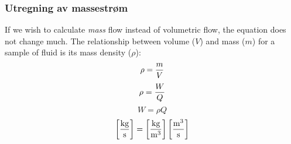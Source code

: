 \documentclass{beamer}
\begin{document}
%
\begin{frame}
	\frametitle{Utregning av massestrøm}

	


%
If we wish to calculate \textit{mass} flow instead of volumetric flow, the equation does not change much.  The relationship between volume ($V$) and mass ($m$) for a sample of fluid is its mass density ($\rho$):
%
$$\rho = {m \over V}$$
%
%
$$\rho = {W \over Q}$$
%
%
$$W = \rho Q$$
%
%
$$\left[\hbox{kg} \over \hbox{s}\right] = \left[{\hbox{kg} \over \hbox{m}^3}\right] \left[{\hbox{m}^3 \over \hbox{s} }\right]$$
%
\end{frame}
%
%
%
%
%
%
%
%
%
%
%
%
%
\end{document}
